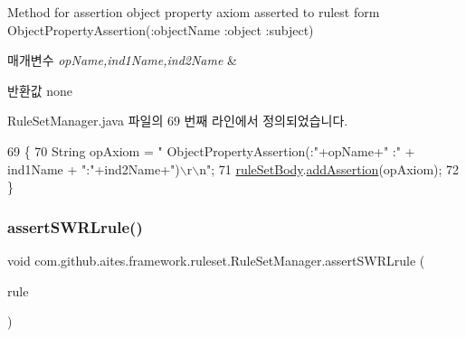 Method for assertion object property axiom asserted to rulest form Object\+Property\+Assertion(\+:object\+Name \+:object \+:subject) 


\begin{DoxyParams}{매개변수}
{\em op\+Name,ind1\+Name,ind2\+Name} & \\
\hline
\end{DoxyParams}
\begin{DoxyReturn}{반환값}
none 
\end{DoxyReturn}


Rule\+Set\+Manager.\+java 파일의 69 번째 라인에서 정의되었습니다.


\begin{DoxyCode}
69                                                                                      \{
70         String opAxiom = \textcolor{stringliteral}{"    ObjectPropertyAssertion(:"}+opName+\textcolor{stringliteral}{" :"} + ind1Name + \textcolor{stringliteral}{":"}+ind2Name+\textcolor{stringliteral}{")\(\backslash\)r\(\backslash\)n"};
71         \mbox{\hyperlink{classcom_1_1github_1_1aites_1_1framework_1_1ruleset_1_1_rule_set_manager_a2218521e8abc1048bd369c7ed1c14c60}{ruleSetBody}}.\mbox{\hyperlink{classcom_1_1github_1_1aites_1_1framework_1_1ruleset_1_1_rule_set_body_ab9c0acf9f356fb04a249b1ea492b65c4}{addAssertion}}(opAxiom);
72     \}
\end{DoxyCode}
\mbox{\label{classcom_1_1github_1_1aites_1_1framework_1_1ruleset_1_1_rule_set_manager_afbff0052a67d70fd8023fba9bab1cb39}} 
\subsubsection{\texorpdfstring{assert\+S\+W\+R\+Lrule()}{assertSWRLrule()}}
{\footnotesize\ttfamily void com.\+github.\+aites.\+framework.\+ruleset.\+Rule\+Set\+Manager.\+assert\+S\+W\+R\+Lrule (\begin{DoxyParamCaption}\item[{\mbox{\hyperlink{classcom_1_1github_1_1aites_1_1framework_1_1rule_1_1_s_w_r_lrule}{S\+W\+R\+Lrule}}}]{rule }\end{DoxyParamCaption})}



